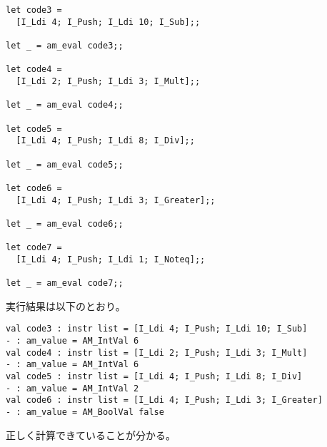 \documentclass[a4paper,9pt]{jarticle}
\begin{document}
\begin{lstlisting}
let code3 =
  [I_Ldi 4; I_Push; I_Ldi 10; I_Sub];;

let _ = am_eval code3;;

let code4 =
  [I_Ldi 2; I_Push; I_Ldi 3; I_Mult];;

let _ = am_eval code4;;

let code5 =
  [I_Ldi 4; I_Push; I_Ldi 8; I_Div];;

let _ = am_eval code5;;

let code6 =
  [I_Ldi 4; I_Push; I_Ldi 3; I_Greater];;

let _ = am_eval code6;;

let code7 =
  [I_Ldi 4; I_Push; I_Ldi 1; I_Noteq];;

let _ = am_eval code7;;

\end{lstlisting}

実行結果は以下のとおり。

\begin{lstlisting}
val code3 : instr list = [I_Ldi 4; I_Push; I_Ldi 10; I_Sub]
- : am_value = AM_IntVal 6
val code4 : instr list = [I_Ldi 2; I_Push; I_Ldi 3; I_Mult]
- : am_value = AM_IntVal 6
val code5 : instr list = [I_Ldi 4; I_Push; I_Ldi 8; I_Div]
- : am_value = AM_IntVal 2
val code6 : instr list = [I_Ldi 4; I_Push; I_Ldi 3; I_Greater]
- : am_value = AM_BoolVal false
\end{lstlisting}
正しく計算できていることが分かる。
\end{document}
